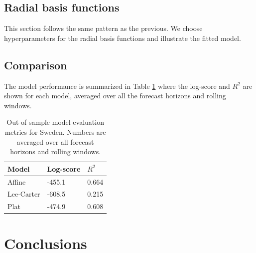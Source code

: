 \documentclass[preprint,12pt]{elsarticle}
\begin{document}
\subsection{Radial basis functions}

This section follows the same pattern as the previous. We choose hyperparameters for the radial basis functions and illustrate the fitted model.


\subsection{Comparison}
The model performance is summarized in Table \ref{table:model_comparision_sweden} where the log-score and $R^2$ are shown for each model, averaged over all the forecast horizons and rolling windows.
\begin{table}[h!]
    \centering
    \begin{tabular}{l l l} 
        \hline
        Model & Log-score & $R^2$ \\  
        \hline\hline
        Affine & -455.1 & 0.664 \\
        Lee-Carter & -608.5 & 0.215 \\ 
        Plat & -474.9 & 0.608 \\
        \hline
    \end{tabular}
    \caption{Out-of-sample model evaluation metrics for Sweden. Numbers are averaged over all forecast horizons and rolling windows.}
    \label{table:model_comparision_sweden}
\end{table}


\section{Conclusions}\label{sec:conclusions}


\end{document}
